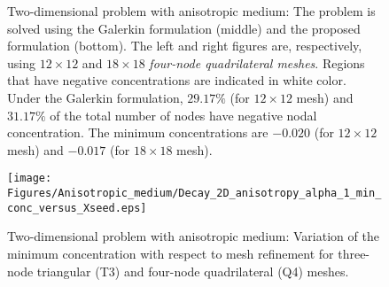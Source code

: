 \documentclass[11pt]{amsart}
\begin{document}
\begin{figure}
  \centering
\caption{Two-dimensional problem with anisotropic medium: The problem is solved using 
      the Galerkin formulation (middle) and the proposed formulation (bottom). The left and right 
      figures are, respectively, using $12 \times 12$ and $18 \times 18$ \emph{four-node 
      quadrilateral meshes}. Regions that have negative concentrations are indicated in white 
      color. Under the Galerkin formulation, $29.17 \%$ (for $12 \times 12$ mesh) and $31.17\%$ 
      of the total number of nodes have negative nodal concentration. The minimum concentrations 
      are $-0.020$ (for $12 \times 12$ mesh) and $-0.017$ (for $18 \times 18$ mesh).}
    \label{Fig:Decay_2D_anisotropic_Q4}
\end{figure}

\begin{figure}[!h]
  \centering
  \texttt{[image: Figures/Anisotropic\_medium/Decay\_2D\_anisotropy\_alpha\_1\_min\_conc\_versus\_Xseed.eps]}
\caption{Two-dimensional problem with anisotropic medium: Variation of the minimum 
    concentration with respect to mesh refinement for three-node triangular (T3) and 
    four-node quadrilateral (Q4) meshes.} \label{Fig:Decay_2D_anisotropic_min_conc_mesh_refinement}
\end{figure}
\end{document}
